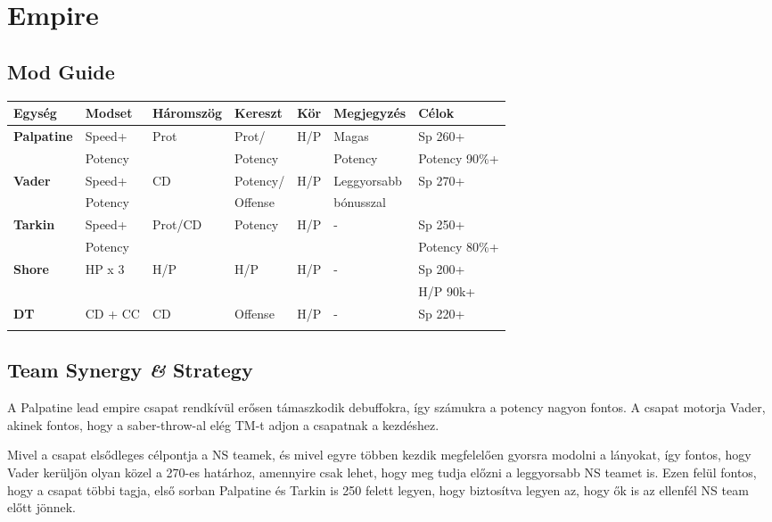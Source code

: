 \documentclass[11pt]{report}
\begin{document}

\chapter{Empire}
\section{Mod Guide}
\begin{center}
    \begin{tabular}{|l | l | l | l | l | l | l |}
        \hline
        Egység & Modset & Háromszög & Kereszt & Kör & Megjegyzés & Célok\\ \hline
        \textbf{Palpatine} & Speed+ & Prot & Prot/ & H/P & Magas & Sp 260+\\
        & Potency &  & Potency &  & Potency & Potency 90\%+\\ \hline
        \textbf{Vader} & Speed+ & CD & Potency/ & H/P & Leggyorsabb & Sp 270+\\
        & Potency &  & Offense &  & bónusszal & \\ \hline
        \textbf{Tarkin} & Speed+ & Prot/CD & Potency & H/P & - & Sp 250+\\
        & Potency &  &  &  &  & Potency 80\%+\\ \hline
        \textbf{Shore} & HP x 3 & H/P & H/P & H/P & - & Sp 200+\\
        &  &  &  &  &  & H/P 90k+\\ \hline
        \textbf{DT} & CD + CC & CD & Offense & H/P & - & Sp 220+\\
        &  &  &  &  &  & \\ \hline
    \end{tabular}
\end{center}
\section{Team Synergy \textit{\&} Strategy}
A Palpatine lead empire csapat rendkívül erősen támaszkodik debuffokra, így számukra a potency nagyon fontos. A csapat motorja Vader, akinek fontos, hogy a saber-throw-al elég TM-t adjon a csapatnak a kezdéshez.\par
Mivel a csapat elsődleges célpontja a NS teamek, és mivel egyre többen kezdik megfelelően gyorsra modolni a lányokat, így fontos, hogy Vader kerüljön olyan közel a 270-es határhoz, amennyire csak lehet, hogy meg tudja előzni a leggyorsabb NS teamet is. Ezen felül fontos, hogy a csapat többi tagja, első sorban Palpatine és Tarkin is 250 felett legyen, hogy biztosítva legyen az, hogy ők is az ellenfél NS team előtt jönnek.
\end{document}

